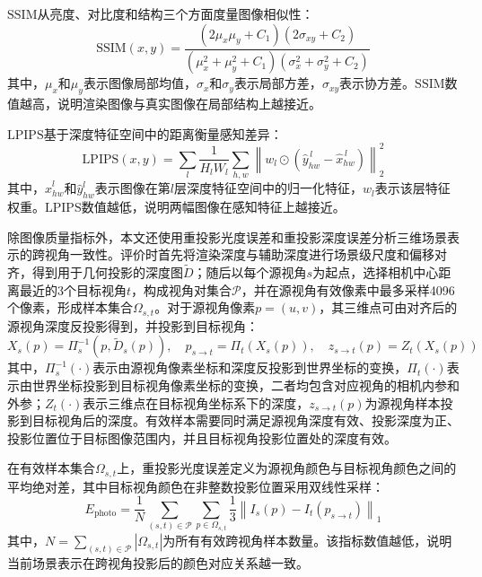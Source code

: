 $\mathrm{SSIM}$从亮度、对比度和结构三个方面度量图像相似性：
\begin{equation}
    \mathrm{SSIM}(x,y)=\frac{(2\mu_x\mu_y+C_1)(2\sigma_{xy}+C_2)}{(\mu_x^2+\mu_y^2+C_1)(\sigma_x^2+\sigma_y^2+C_2)}
\end{equation}
其中，$\mu_x$和$\mu_y$表示图像局部均值，$\sigma_x$和$\sigma_y$表示局部方差，$\sigma_{xy}$表示协方差。$\mathrm{SSIM}$数值越高，说明渲染图像与真实图像在局部结构上越接近。

$\mathrm{LPIPS}$基于深度特征空间中的距离衡量感知差异：
\begin{equation}
    \mathrm{LPIPS}(x,y)=\sum_l\frac{1}{H_lW_l}\sum_{h,w}\left\|w_l\odot\left(\hat y_{hw}^{\,l}-\hat x_{hw}^{\,l}\right)\right\|_2^2
\end{equation}
其中，$\hat x_{hw}^l$和$\hat y_{hw}^l$表示图像在第$l$层深度特征空间中的归一化特征，$w_l$表示该层特征权重。$\mathrm{LPIPS}$数值越低，说明两幅图像在感知特征上越接近。

除图像质量指标外，本文还使用重投影光度误差和重投影深度误差分析三维场景表示的跨视角一致性。评价时首先将渲染深度与辅助深度进行场景级尺度和偏移对齐，得到用于几何投影的深度图$\tilde D$；随后以每个源视角$s$为起点，选择相机中心距离最近的3个目标视角$t$，构成视角对集合$\mathcal{P}$，并在源视角有效像素中最多采样4096个像素，形成样本集合$\Omega_{s,t}$。对于源视角像素$p=(u,v)$，其三维点可由对齐后的源视角深度反投影得到，并投影到目标视角：
\begin{equation}
    X_s(p)=\Pi_s^{-1}\left(p,\tilde D_s(p)\right),\quad
    p_{s\rightarrow t}=\Pi_t\left(X_s(p)\right),\quad
    z_{s\rightarrow t}(p)=Z_t\left(X_s(p)\right)
\end{equation}
其中，$\Pi_s^{-1}(\cdot)$表示由源视角像素坐标和深度反投影到世界坐标的变换，$\Pi_t(\cdot)$表示由世界坐标投影到目标视角像素坐标的变换，二者均包含对应视角的相机内参和外参；$Z_t(\cdot)$表示三维点在目标视角坐标系下的深度，$z_{s\rightarrow t}(p)$为源视角样本投影到目标视角后的深度。有效样本需要同时满足源视角深度有效、投影深度为正、投影位置位于目标图像范围内，并且目标视角投影位置处的深度有效。

在有效样本集合$\Omega_{s,t}$上，重投影光度误差定义为源视角颜色与目标视角颜色之间的平均绝对差，其中目标视角颜色在非整数投影位置采用双线性采样：
\begin{equation}
    E_{\mathrm{photo}}=\frac{1}{N}\sum_{(s,t)\in\mathcal{P}}\sum_{p\in\Omega_{s,t}}
    \frac{1}{3}\left\|I_s(p)-I_t(p_{s\rightarrow t})\right\|_1
\end{equation}
其中，$N=\sum_{(s,t)\in\mathcal{P}}|\Omega_{s,t}|$为所有有效跨视角样本数量。该指标数值越低，说明当前场景表示在跨视角投影后的颜色对应关系越一致。

